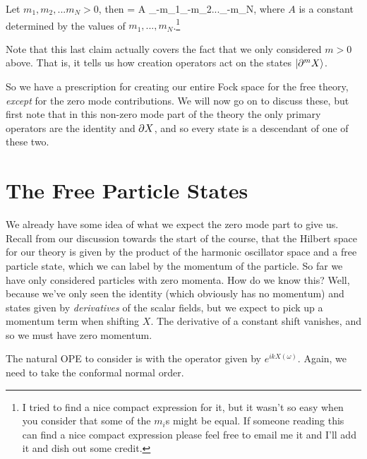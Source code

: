 \bcl 
    Let $m_1,m_2,...m_N >0$, then 
    \be 
         = A \a_{-m_1}\a_{-m_2}...\a_{-m_N},
    \ee 
    where $A$ is a constant determined by the values of $m_1,...,m_N$.\footnote{I tried to find a nice compact expression for it, but it wasn't so easy when you consider that some of the $m_i$s might be equal. If someone reading this can find a nice compact expression please feel free to email me it and I'll add it and dish out some credit.}
\ecl 

\br 
    Note that this last claim actually covers the fact that we only considered $m>0$ above. That is, it tells us how creation operators act on the states $\ket{\partial^mX}$.
\er 

So we have a prescription for creating our entire Fock space for the free theory, \textit{except} for the zero mode contributions. We will now go on to discuss these, but first note that in this non-zero mode part of the theory the only primary operators are the identity and $\partial X$, and so every state is a descendant of one of these two. 

\section{The Free Particle States}

We already have some idea of what we expect the zero mode part to give us. Recall from our discussion towards the start of the course, that the Hilbert space for our theory is given by the product of the harmonic oscillator space and a free particle state, which we can label by the momentum of the particle. So far we have only considered particles with zero momenta. How do we know this? Well, because we've only seen the identity (which obviously has no momentum) and states given by \textit{derivatives} of the scalar fields, but we expect to pick up a momentum term when shifting $X$. The derivative of a constant shift vanishes, and so we must have zero momentum. 

The natural OPE to consider is with the operator given by $e^{ikX(\omega)}$. Again, we need to take the conformal normal order. 

